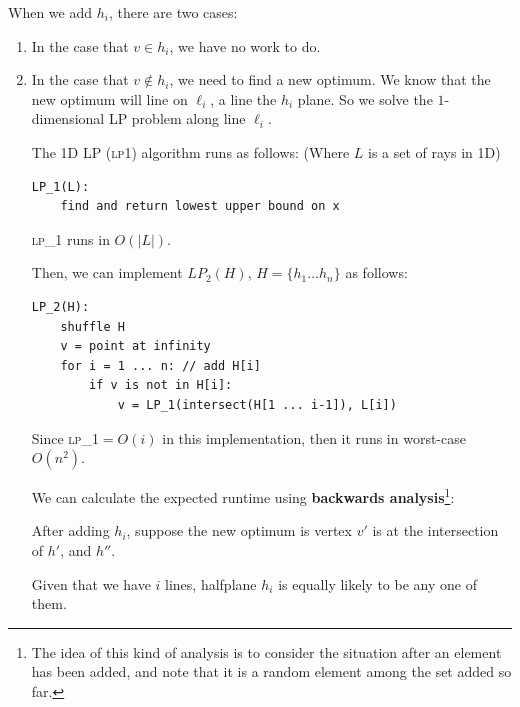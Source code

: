                 When we add $h_i$, there are two cases:
                \begin{enumerate}
                    \item In the case that $v \in h_i$, we have no work to do.
                    \item In the case that $v \not \in h_i$, we need to find a new optimum.
                    We know that the new optimum will line on $\ell_i$, a line the $h_i$ plane.
                    So we solve the $1$-dimensional LP problem along line $\ell_i$.

                    The 1D LP (\textsc{lp1}) algorithm runs as follows: (Where $L$ is a set of rays in 1D)
                    \begin{lstlisting}
LP_1(L):
    find and return lowest upper bound on x
                    \end{lstlisting}
                    \textsc{lp\_1} runs in $O(|L|)$.

                    Then, we can implement $LP_2(H)$, $H = \{h_1 \ldots h_n\}$ as follows:
                    \begin{lstlisting}
LP_2(H):
    shuffle H
    v = point at infinity
    for i = 1 ... n: // add H[i]
        if v is not in H[i]:
            v = LP_1(intersect(H[1 ... i-1]), L[i])
                    \end{lstlisting}

                    Since \textsc{lp\_1}$= O(i)$ in this implementation, then it runs in worst-case $O(n^2)$.

                    We can calculate the expected runtime using \textbf{backwards analysis}\footnote{The idea of this kind of analysis is to consider the situation after an element has been added, and note that it is a random element among the set added so far.}:

                    After adding $h_i$, suppose the new optimum is vertex $v'$ is at the intersection of $h'$, and $h''$.

                    Given that we have $i$ lines, halfplane $h_i$ is equally likely to be any one of them.


\end{enumerate}
